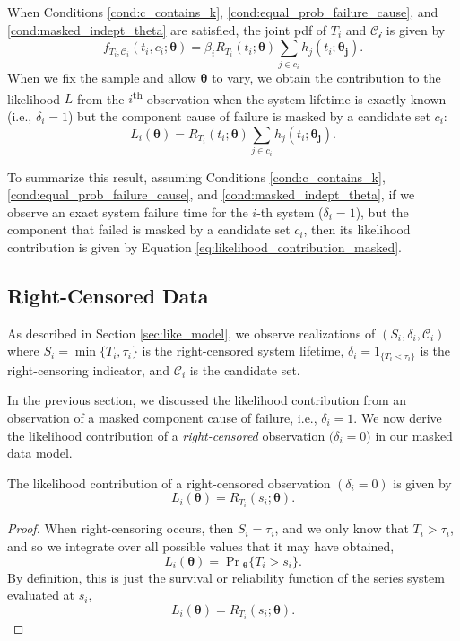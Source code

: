 \documentclass[
]{article}
\begin{document}
When Conditions \ref{cond:c_contains_k},
\ref{cond:equal_prob_failure_cause}, and \ref{cond:masked_indept_theta}
are satisfied, the joint pdf of \(T_i\) and \(\mathcal{C_i}\) is given
by \[
f_{T_i,\mathcal{C}_i}(t_i,c_i;\boldsymbol{\theta}) =
    \beta_i R_{T_i}(t_i;\boldsymbol{\theta})
    \sum_{j \in c_i} h_j(t_i;\boldsymbol{\theta_j}).
\] When we fix the sample and allow \(\boldsymbol{\theta}\) to vary, we
obtain the contribution to the likelihood \(L\) from the
\(i\)\textsuperscript{th} observation when the system lifetime is
exactly known (i.e., \(\delta_i = 1\)) but the component cause of
failure is masked by a candidate set \(c_i\): \begin{equation}
\label{eq:likelihood_contribution_masked}
L_i(\boldsymbol{\theta}) = R_{T_i}(t_i;\boldsymbol{\theta}) \sum_{j \in c_i} h_j(t_i;\boldsymbol{\theta_j}).
\end{equation}

To summarize this result, assuming Conditions \ref{cond:c_contains_k},
\ref{cond:equal_prob_failure_cause}, and \ref{cond:masked_indept_theta},
if we observe an exact system failure time for the \(i\)-th system
(\(\delta_i = 1\)), but the component that failed is masked by a
candidate set \(c_i\), then its likelihood contribution is given by
Equation \eqref{eq:likelihood_contribution_masked}.

\hypertarget{right-censored-data}{%
\subsection{Right-Censored Data}\label{right-censored-data}}

As described in Section \ref{sec:like_model}, we observe realizations of
\((S_i,\delta_i,\mathcal{C}_i)\) where \(S_i = \min\{T_i,\tau_i\}\) is
the right-censored system lifetime, \(\delta_i = 1_{\{T_i < \tau_i\}}\)
is the right-censoring indicator, and \(\mathcal{C}_i\) is the candidate
set.

In the previous section, we discussed the likelihood contribution from
an observation of a masked component cause of failure, i.e.,
\(\delta_i = 1\). We now derive the likelihood contribution of a
\emph{right-censored} observation \((\delta_i = 0\)) in our masked data
model.

\begin{theorem}
\label{thm:joint_s_d_c}
The likelihood contribution of a right-censored observation $(\delta_i = 0)$
is given by
\begin{equation}
L_i(\boldsymbol{\theta}) = R_{T_i}(s_i;\boldsymbol{\theta}).
\end{equation}
\end{theorem}
\begin{proof}
When right-censoring occurs, then $S_i = \tau_i$, and we only know that
$T_i > \tau_i$, and so we integrate over all possible values that it may have
obtained,
$$
L_i(\boldsymbol{\theta}) = \Pr\!{}_{\boldsymbol{\theta}}\{T_i > s_i\}.
$$
By definition, this is just the survival or reliability function of the series system
evaluated at $s_i$,
$$
L_i(\boldsymbol{\theta}) = R_{T_i}(s_i;\boldsymbol{\theta}).
$$
\end{proof}
\end{document}
